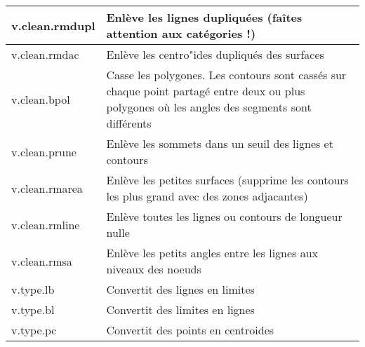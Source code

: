 \begin{table}[ht]
\begin{tabular}{|p{4cm}|p{12cm}|}
  \hline v.clean.rmdupl & Enl\`eve les lignes dupliqu\'ees  (fa\^ites attention aux cat\'egories !) \\
  \hline v.clean.rmdac & Enl\`eve les centro"ides dupliqu\'es des surfaces\\
  \hline v.clean.bpol & Casse les polygones. Les contours sont cass\'es sur chaque point partag\'e entre deux ou plus polygones o\`u les angles des segments sont diff\'erents\\
  \hline v.clean.prune & Enl\`eve les sommets dans un seuil des lignes et contours\\
  \hline v.clean.rmarea & Enl\`eve les petites surfaces (supprime les contours les plus grand avec des zones adjacantes) \\
  \hline v.clean.rmline & Enl\`eve toutes les lignes ou contours de longueur nulle\\
  \hline v.clean.rmsa & Enl\`eve les petits angles entre les lignes aux niveaux des noeuds\\
  \hline v.type.lb & Convertit des lignes en limites\\
  \hline v.type.bl & Convertit des limites en lignes\\
  \hline v.type.pc & Convertit des points en centroides \\

\end{tabular}
\end{table}
